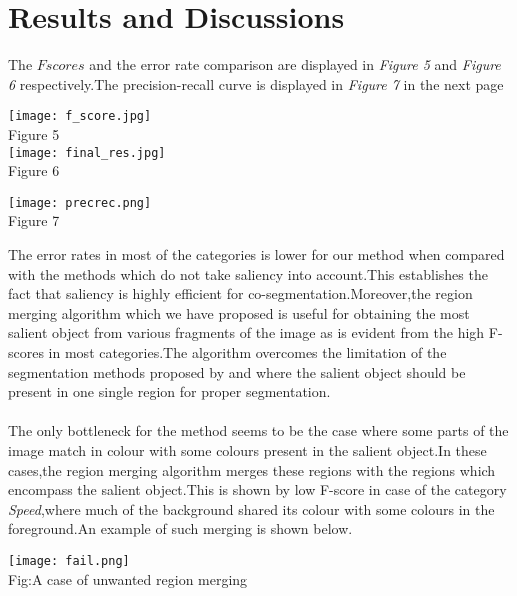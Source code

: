 \documentclass{article}
\begin{document}
\section{Results and Discussions}
The $F scores$ and the error rate comparison are displayed in \emph{Figure 5} and \emph{Figure 6} respectively.The precision-recall curve is displayed in \emph{Figure 7} in the next page\\
\vspace{-10 mm}
\begin{center}
\texttt{[image: f\_score.jpg]}\\Figure 5\\
\texttt{[image: final\_res.jpg]}\\Figure 6\\
\end{center}
\begin{center}
\texttt{[image: precrec.png]}\\Figure 7\\
\end{center}
The error rates in most of the categories is lower for our method when compared with the methods which do not take saliency into account.This establishes the fact that saliency is highly efficient for co-segmentation.Moreover,the region merging algorithm which we have proposed is useful for obtaining the most salient object from various fragments of the image as is evident from the high F-scores in most categories.The algorithm overcomes the limitation of the segmentation methods proposed by \cite{6194335} and \cite{11cvpr/Cheng_Saliency} where the salient object should be present in one single region for proper segmentation.\\\\
The only bottleneck for the method seems to be the case where some parts of the image match in colour with some colours present in the salient object.In these cases,the region merging algorithm merges these regions with the regions which encompass the salient object.This is shown by low F-score in case of the category \emph{Speed},where much of the background shared its colour with some colours in the foreground.An example of such merging is shown below.\\
\begin{center}
\texttt{[image: fail.png]}\\Fig:A case of unwanted region merging\\
\end{center}
\vspace{5 mm}
\end{document}
